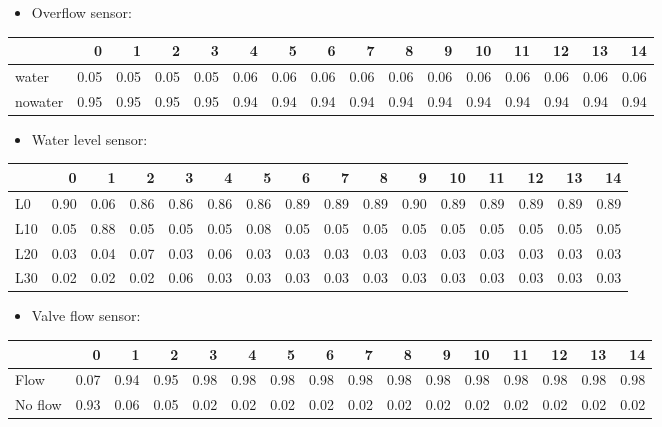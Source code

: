 \documentclass[colorlinks=true,linkcolor=blue]{article}
\begin{document}
\begin{itemize}
\item Overflow sensor:
\end{itemize}
\begin{center}
\begin{tabular}{l|rrrrrrrrrrrrrrr|}
 & 0 & 1 & 2 & 3 & 4 & 5 & 6 & 7 & 8 & 9 & 10 & 11 & 12 & 13 & 14\\
\hline
water & 0.05 & 0.05 & 0.05 & 0.05 & 0.06 & 0.06 & 0.06 & 0.06 & 0.06 & 0.06 & 0.06 & 0.06 & 0.06 & 0.06 & 0.06\\
nowater & 0.95 & 0.95 & 0.95 & 0.95 & 0.94 & 0.94 & 0.94 & 0.94 & 0.94 & 0.94 & 0.94 & 0.94 & 0.94 & 0.94 & 0.94\\
\end{tabular}
\end{center}

\begin{itemize}
\item Water level sensor:
\end{itemize}
\begin{center}
\begin{tabular}{l|rrrrrrrrrrrrrrr|}
 & 0 & 1 & 2 & 3 & 4 & 5 & 6 & 7 & 8 & 9 & 10 & 11 & 12 & 13 & 14\\
\hline
L0 & 0.90 & 0.06 & 0.86 & 0.86 & 0.86 & 0.86 & 0.89 & 0.89 & 0.89 & 0.90 & 0.89 & 0.89 & 0.89 & 0.89 & 0.89\\
L10 & 0.05 & 0.88 & 0.05 & 0.05 & 0.05 & 0.08 & 0.05 & 0.05 & 0.05 & 0.05 & 0.05 & 0.05 & 0.05 & 0.05 & 0.05\\
L20 & 0.03 & 0.04 & 0.07 & 0.03 & 0.06 & 0.03 & 0.03 & 0.03 & 0.03 & 0.03 & 0.03 & 0.03 & 0.03 & 0.03 & 0.03\\
L30 & 0.02 & 0.02 & 0.02 & 0.06 & 0.03 & 0.03 & 0.03 & 0.03 & 0.03 & 0.03 & 0.03 & 0.03 & 0.03 & 0.03 & 0.03\\
\end{tabular}
\end{center}


\begin{itemize}
\item Valve flow sensor:
\end{itemize}
\begin{center}
\begin{tabular}{l|rrrrrrrrrrrrrrr|}
 & 0 & 1 & 2 & 3 & 4 & 5 & 6 & 7 & 8 & 9 & 10 & 11 & 12 & 13 & 14\\
\hline
Flow & 0.07 & 0.94 & 0.95 & 0.98 & 0.98 & 0.98 & 0.98 & 0.98 & 0.98 & 0.98 & 0.98 & 0.98 & 0.98 & 0.98 & 0.98\\
No flow & 0.93 & 0.06 & 0.05 & 0.02 & 0.02 & 0.02 & 0.02 & 0.02 & 0.02 & 0.02 & 0.02 & 0.02 & 0.02 & 0.02 & 0.02\\
\end{tabular}
\end{center}
\end{document}
